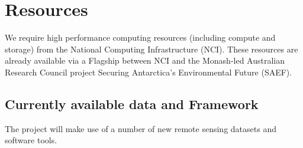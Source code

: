 \chapter{Resources}

We require high performance computing resources (including compute and storage) from the National Computing Infrastructure (NCI). These resources are already available via a Flagship between NCI and the Monash-led Australian Research Council project Securing Antarctica’s Environmental Future (SAEF).

\section*{Currently available data and Framework}\label{data}
The project will make use of a number of new remote sensing datasets and software tools.

